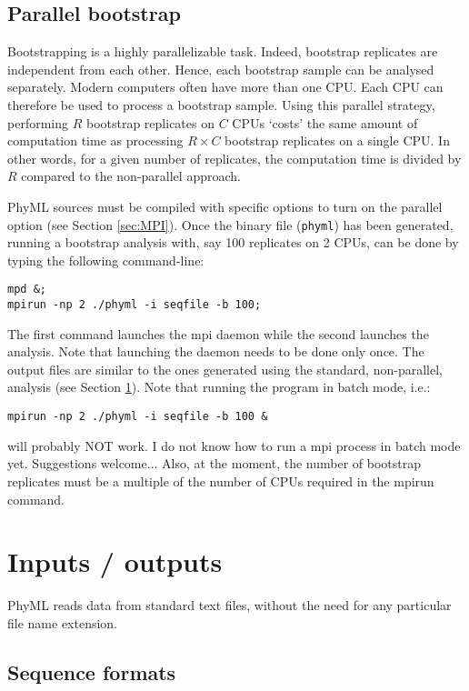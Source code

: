 \documentclass[a4paper,12pt]{article}
\newcommand{\x}[1]{\texttt{#1}}
\begin{document}
  
\subsection{Parallel  bootstrap}\label{sec:parallel_bootstrap}

Bootstrapping is  a highly  parallelizable task. Indeed,  bootstrap replicates are  independent from
each other.   Hence, each bootstrap sample can  be analysed separately. Modern  computers often have
more than one CPU. Each CPU can therefore be used to process a bootstrap sample. Using this parallel
strategy, performing  $R$ bootstrap replicates  on $C$ CPUs  `costs' the same amount  of computation
time as processing $R  \times C$ bootstrap replicates on a single CPU.  In  other words, for a given
number of replicates, the computation time is divided by $R$ compared to the non-parallel approach.

PhyML sources  must be compiled with  specific options to turn  on the parallel  option (see Section
\ref{sec:MPI}). Once  the binary file (\x{phyml})  has been generated, running  a bootstrap analysis
with, say 100 replicates on 2 CPUs, can be done by typing the following command-line:
\begin{verbatim}
mpd &;
mpirun -np 2 ./phyml -i seqfile -b 100;
\end{verbatim} 
The  first command  launches  the mpi  daemon  while the  second launches  the  analysis. Note  that
launching the daemon needs to be done only once.  The output files are similar to the ones generated
using the standard, non-parallel, analysis (see Section \ref{sec:input_output}). Note that running 
the program in batch mode, i.e.:
\begin{verbatim}
mpirun -np 2 ./phyml -i seqfile -b 100 &
\end{verbatim} 
will probably NOT work. I do not know how to run a mpi process in batch mode yet. Suggestions welcome...
Also, at the moment, the number of bootstrap replicates must be a multiple of the number of CPUs
required in the mpirun command.

\section{Inputs / outputs}\label{sec:input_output}

PhyML reads data from standard text files,  without the need for any particular file name extension.

\subsection{Sequence formats}
\end{document}
